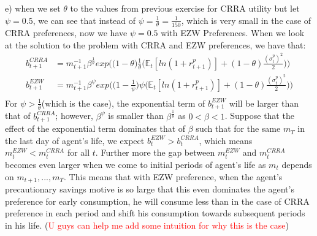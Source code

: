 \documentclass[12pt,a4paper]{article}
\begin{document}
e) when we set $\theta$ to the values from previous exercise for CRRA utility but let $\psi=0.5$, we can see that instead of $\psi=\frac{1}{\theta}=\frac{1}{150}$, which is very small in the case of CRRA preferences, now we have $\psi=0.5$ with EZW Preferences. When we look at the solution to the problem with CRRA and EZW preferences, we have that:
\begin{align*}
    b_{t+1}^{CRRA}&=m_{t+1}^{-1}\beta^{\frac{1}{\theta}}  exp\bigg(\bigg  (1-\theta\bigg)\frac{1}{\theta}\bigg(\mathbb{E}_t[ln(1+r^p_{t+1})]+(1-\theta)\frac{(\sigma_t^p)^2}{2}\bigg)\bigg)\\
     b_{t+1}^{EZW}&=m_{t+1}^{-1}\beta^\psi exp\bigg(\bigg(1-\frac{1}{\psi}\bigg)\psi\bigg(\mathbb{E}_t[ln(1+r^p_{t+1})]+(1-\theta)\frac{(\sigma_t^p)^2}{2}\bigg)\bigg)\\
\end{align*}
For $\psi>\frac{1}{\theta}$(which is the case), the exponential term of $b_{t+1}^{EZW}$ will be larger than that of $b_{t+1}^{CRRA}$; however, $\beta^\psi$ is smaller than $\beta^\frac{1}{\theta}$ as $0<\beta<1$. Suppose that the effect of the exponential term dominates that of $\beta$ such that for the same $m_T$ in the last day of agent's life, we expect $b_t^{EZW}>b_t^{CRRA}$, which means $m_t^{EZW}<m_t^{CRRA}$ for all $t$. Further more the gap between $m_t^{EZW}$ and $m_t^{CRRA}$ becomes even larger when we come to initial periods of agent's life as $m_t$ depends on $m_{t+1},...,m_T$. This means that with EZW preference, when the agent's precautionary savings motive is so large that this even dominates the agent's preference for early consumption, he will consume less than in the case of CRRA preference in each period and shift his consumption towards subsequent periods in his life. (\textcolor{red}{U guys can help me add some intuition for why this is the case}) \\
\end{document}
